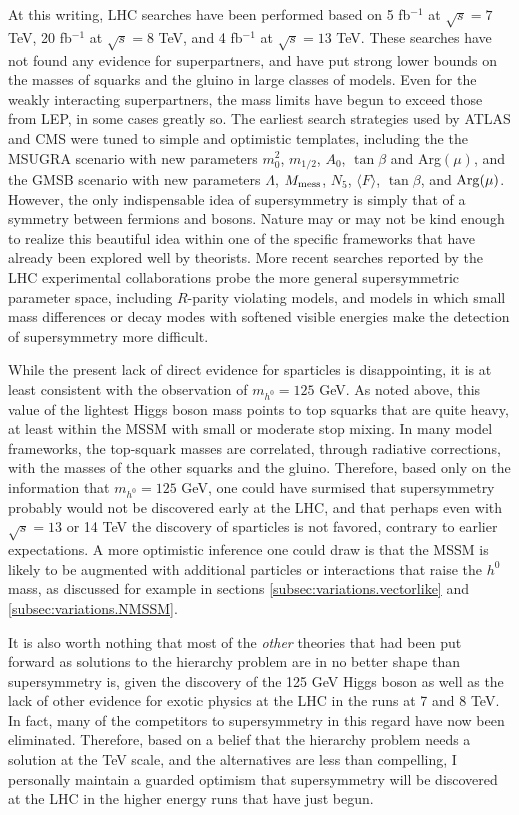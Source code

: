 \documentclass[11pt]{article}
\def\nmess{N_5}
\begin{document}
At this writing, LHC searches have been performed
based on 5 fb$^{-1}$ at $\sqrt{s} = 7$ TeV,
20 fb$^{-1}$ at $\sqrt{s} = 8$ TeV, and 4 fb$^{-1}$ at $\sqrt{s} = 13$ TeV.
These searches have not found any evidence for superpartners, and 
have put strong lower bounds on the masses of squarks and the gluino in 
large classes of models. Even for the weakly interacting 
superpartners, the mass limits have begun to exceed those from LEP, in some 
cases greatly so. The earliest search strategies used by ATLAS and CMS were 
tuned to simple and optimistic templates, including the the MSUGRA 
scenario with new parameters $m^2_0$, $m_{1/2}$, $A_0$, $\tan\beta$ and 
Arg$(\mu )$, and the GMSB scenario with new parameters $\Lambda$, 
$M_{\rm mess}$, $\nmess$, $\langle F \rangle$, $\tan\beta$, and ${\rm 
Arg}(\mu )$. However, the only indispensable idea of supersymmetry is 
simply that of a symmetry between fermions and bosons. Nature may or may 
not be kind enough to realize this beautiful idea within one of the 
specific frameworks that have already been explored well by theorists. 
More recent searches reported by the LHC experimental collaborations 
probe the more general supersymmetric parameter space, including 
$R$-parity violating models, and models in which small mass differences 
or decay modes with softened visible energies  
make the detection of supersymmetry more difficult.

While the present lack of direct evidence for sparticles is 
disappointing, it is at least consistent with the observation of 
$m_{h^0} = 125$ GeV. As noted above, this value of the lightest Higgs 
boson mass points to top squarks that are quite heavy, at least within 
the MSSM with small or moderate stop mixing. In many model frameworks, 
the top-squark masses are correlated, through radiative corrections, 
with the masses of the other squarks and the gluino. Therefore, based only on 
the information that $m_{h^0} = 125$ GeV, one could have surmised 
that supersymmetry probably would not be discovered early at the LHC, and that 
perhaps even with $\sqrt{s} =13$ or 14 TeV the discovery of sparticles is 
not favored, contrary to earlier expectations. A more 
optimistic inference one could draw is that the MSSM is likely to be augmented 
with additional particles or interactions that raise the $h^0$ mass, as 
discussed for example in sections \ref{subsec:variations.vectorlike}
and \ref{subsec:variations.NMSSM}.

It is also worth nothing that most of the {\em other} theories that had been 
put forward as solutions to the hierarchy problem are in no better 
shape than supersymmetry is, given the discovery of the 
125 GeV Higgs boson as well as the lack of other evidence for 
exotic physics at the LHC in the runs at 7 and 8 TeV. 
In fact, many of the competitors to supersymmetry 
in this regard have now been eliminated. Therefore, based on a belief that 
the hierarchy problem needs a solution at the TeV scale, and the alternatives are less than compelling,
I personally maintain a guarded optimism that supersymmetry 
will be discovered at the LHC in the higher energy runs that have just begun. 
\end{document}
